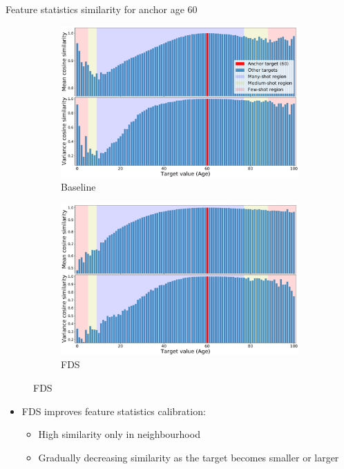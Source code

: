 \begin{frame}{Feature statistics similarity for anchor age 60}
	\begin{figure}[h]
		\begin{subfigure}{0.48\textwidth}
			\includegraphics[width=\linewidth]{images/feat_sim_fds_base_60.pdf}
			\caption{Baseline}
		\end{subfigure}\hspace{1em}%
		\begin{subfigure}{0.48\textwidth}
			\includegraphics[width=\linewidth]{images/feat_sim_fds_ours_60.pdf}
			\caption{FDS}
		\end{subfigure}
	\end{figure}
	\begin{itemize}
		\item FDS improves feature statistics calibration:
		\begin{itemize}
			\item High similarity only in neighbourhood
			\item Gradually decreasing similarity as the target becomes smaller or larger
		\end{itemize}
	\end{itemize}
\end{frame}

